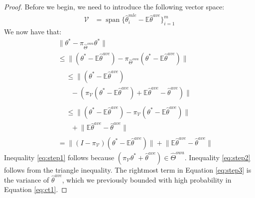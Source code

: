 \documentclass[twoside]{article}
\DeclareMathOperator*{\vecspan}{span}
\newcommand{\W}{{\hat \Theta^{\textit{owa}}}}
\newcommand{\V}{\mathcal{V}}
\newcommand{\E}{\mathbb{E}}
\newcommand{\vv}{\mathbf{v}}
\newcommand{\x}{\mathbf{x}}
\newcommand{\w}{\theta}
\newcommand{\wave}{\hat\w^{ave}}
\newcommand{\wtave}{\E\hat\w^{ave}}
\newcommand{\wmle}{\hat\w^{mle}}
\newcommand{\wstar}{{\w^{*}}}
\newcommand{\ltwo}[1]{{\lVert {#1} \rVert}}
\newcommand{\proj}[1]{\pi_{{#1}}}
\begin{document}
\begin{proof}
{Before we begin, we need to introduce the following vector space:
\begin{align}
\V &= \vecspan \{\wmle_i - \wtave\}_{i=1}^m
\end{align}
We now have that:
\begin{align}
~~~~&\!\!\!\!\!\!\!\!\!\!\!\!\ltwo{\wstar-\proj\W\wstar}
\nonumber
\\
&\le
\ltwo{(\wstar-\wtave) - \proj\W(\wstar-\wtave)}
\\
&\begin{aligned}
&\le
\lVert(\wstar-\wtave)
\\
&~~~
- (\proj\V(\wstar-\wtave) + \wtave - \wave)
\rVert
\end{aligned}
\\
&\begin{aligned}
&\le
\ltwo{(\wstar-\wtave) - \proj\V(\wstar-\wtave)}
\\
&~~~
+ \ltwo{\wtave - \wave}
\end{aligned}
\\
&=
\ltwo{(I-\proj\V)(\wstar-\wtave)} + \ltwo{\wtave - \wave}
%
%
%
\end{align}
Inequality \ref{eq:step1} follows because $(\proj\V\wstar + \wave) \in \W$.
Inequality \ref{eq:step2} follows from the triangle inequality.
The rightmost term in Equation \ref{eq:step3} is the variance of $\wave$,
which we previously bounded with high probability in Equation \ref{eq:ct1}.

}
\end{proof}
\end{document}
